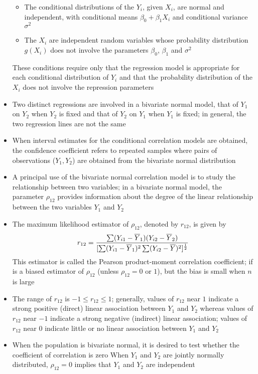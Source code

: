 \begin{itemize}
\begin{itemize}
\item The conditional distributions of the $Y_i$, given $X_i$, are normal and independent, with conditional means $\beta_0 + \beta_1X_i$ and conditional variance $\sigma^2$
\item The $X_i$ are independent random variables whose probability distribution $g(X_i)$ does not involve the parameters $\beta_0$, $\beta_1$ and $\sigma^2$ \end{itemize} 
These conditions require only that the regression model is appropriate for each conditional distribution of $Y_i$ and that the probability distribution of the $X_i$ does not involve the repression parameters 
\item Two distinct regressions are involved in a bivariate normal model, that of $Y_1$ on $Y_2$ when $Y_2$ is fixed and that of $Y_2$ on $Y_1$ when $Y_1$ is fixed; in general, the two regression lines are not the same
\item When interval estimates for the conditional correlation models are obtained, the confidence coefficient refers to repeated samples where pairs of observations ($Y_1, Y_2$) are obtained from the bivariate normal distribution 
\item A principal use of the bivariate normal correlation model is to study the relationship between two variables; in a bivariate normal model, the parameter $\rho_{12}$ provides information about the degree of the linear relationship between the two variables $Y_1$ and $Y_2$
\item The maximum likelihood estimator of $\rho_{12}$, denoted by $r_{12}$, is given by $$ r_{12} = \frac{\sum (Y_{i1} - \overline{Y}_1)(Y_{i2} - \overline{Y}_2)}{[\sum (Y_{i1} - \overline{Y}_1)^2 \sum (Y_{i2} - \overline{Y})^2]^{\frac{1}{2}}} $$ This estimator is called the Pearson product-moment correlation coefficient; if is a biased estimator of $\rho_{12}$ (unless $\rho_{12} = 0$ or $1$), but the bias is small when $n$ is large 
\item The range of $r_{12}$ is $-1 \leq r_{12} \leq 1$; generally, values of $r_{12}$ near $1$ indicate a strong positive (direct) linear association between $Y_1$ and $Y_2$ whereas values of $r_{12}$ near $-1$ indicate a strong negative (indirect) linear association; values of $r_{12}$ near $0$ indicate little or no linear association between $Y_1$ and $Y_2$ 
\item When the population is bivariate normal, it is desired to test whether the coefficient of correlation is zero  When $Y_1$ and $Y_2$ are jointly normally distributed, $\rho_{12} = 0$ implies that $Y_1$ and $Y_2$ are independent 

\end{itemize}
